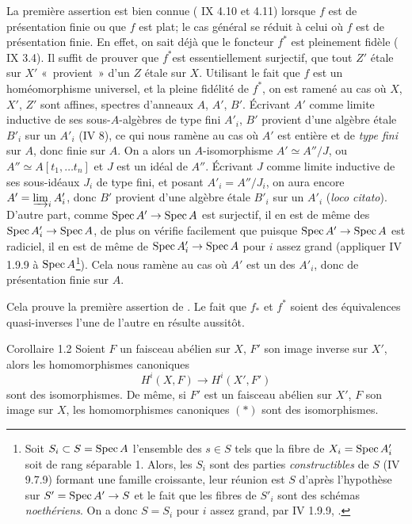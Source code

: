\documentclass[10pt]{../fichiers-configuration-latex/smfart}
\begin{document}
La première assertion est bien connue (\SGA{} IX 4.10 et 4.11) lorsque
$f$ est de présentation finie ou que $f$ est plat; le cas général se
réduit à celui où $f$ est de présentation  finie. En effet, on sait
déjà que le foncteur $f^{\ast}$ est pleinement fidèle ( IX
3.4). Il suffit de prouver que $f^{\ast}$\pageoriginale  est
essentiellement surjectif, \ie que tout $Z'$ étale sur $X'$ « provient » d'un $Z$ étale sur $X$. Utilisant le fait que $f$ est
un homéomorphisme universel, et la pleine fidélité de $f^{\ast}$, on
est ramené au cas où $X$, $X'$, $Z'$ sont affines, spectres
d'anneaux $A$, $A'$, $B'$. Écrivant $A'$ comme limite inductive de
ses sous-$A$-algèbres de type fini $A'_{i}$, $B'$ provient d'une
algèbre étale $B'_{i}$ sur un $A'_{i}$ (\cf \EGA IV 8), ce qui nous
ramène au cas où $A'$ est entière et de \emph{type fini} sur $A$,
donc finie sur $A$. On a alors un $A$-isomorphisme $A'\simeq A''/J$,
ou $A'' \simeq A [t_1, \ldots t_n]$ et $J$ est un idéal de $A''$.
Écrivant $J$ comme limite inductive de ses sous-idéaux $J_i$ de type
fini, et posant $A'_i = A'' /J_i$, on aura encore $A' = \varinjlim_i
A'_{i}$, donc $B'$ provient d'une algèbre étale $B'_i$ sur un $A'_i$
(\emph{loco citato}). D'autre part, comme $\Spec A'\to \Spec A$ est
surjectif, il en est de même des $\Spec A'_i \to \Spec A$, de plus
on vérifie facilement que puisque $\Spec A'\to \Spec A$ est
radiciel, il en est de même de $\Spec A'_i \to \Spec A$ pour $i$
assez grand (appliquer \EGA IV 1.9.9 à $\operatorname{Spec} A$\footnote{Soit $S_i
\subset S =
  \operatorname{Spec} A$ l'ensemble des $s \in S$ tels que la fibre de $X_i = \operatorname{Spec}
  A'_i$  soit de rang séparable 1. Alors, les $S_i$ sont des
  parties \emph{constructibles} de $S$ (\EGA IV 9.7.9) formant une
  famille croissante, leur réunion est $S$ d'après l'hypothèse sur $S'=
  \Spec A'\to S$ et le fait que les fibres de $S'_i$ sont des
  schémas \emph{noethériens}. On a donc $S = S_i$ pour $i$ assez
  grand, par \EGA IV 1.9.9, \cqfd.}). Cela nous ramène au cas où $A'$
est un des $A'_i$, donc de présentation finie sur $A$.

Cela prouve la première assertion de .
Le fait que $f_{\ast}$ et
$f^{\ast}$ soient des équivalences quasi-inverses l'une de l'autre en
résulte aussitôt.

\begin{enonce*}{Corollaire 1.2}
Soient $F$ un faisceau abélien sur $X$, $F'$ son image inverse sur
$X'$, alors les homomorphismes canoniques
\begin{equation*}
H^{i} (X, F) \to H^{i} (X', F')\tag{$\ast$}
\end{equation*}
sont des isomorphismes. De même, si $F'$ est un faisceau abélien sur
$X'$, $F$ son image sur $X$, les homomorphismes canoniques $(\ast)$
sont des isomorphismes.
\end{enonce*}
\end{document}
